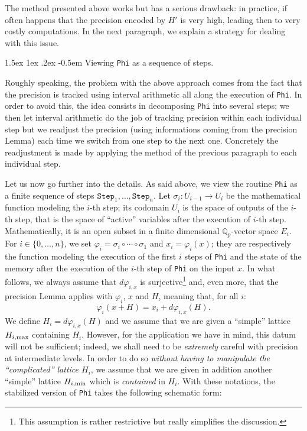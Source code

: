 \documentclass[11pt]{article}
\makeatletter
\numberwithin{equation}{section}
\numberwithin{figure}{section}
\renewcommand\subparagraph{\@startsection{subparagraph}{5}{\z@}%
                                       {1.5ex \@plus1ex \@minus .2ex}%
                                       {-0.5em}%
                                      {\normalfont\normalsize\it}}
\theoremstyle{definition}
\newcommand{\Q}{\mathbb Q}
\newcommand{\Qp}{\Q_p}
\renewcommand{\min}{\text{\rm min}}
\renewcommand{\max}{\text{\rm max}}
\makeatother
\begin{document}
\noindent
The method presented above works but has a serious drawback: in 
practice, if often happens that the precision encoded by $H'$ 
is very high, leading then to very costly computations. In the next 
paragraph, we explain a strategy for dealing with this issue.

\subparagraph{Viewing \textrm{\tt Phi} as a sequence of steps.}

Roughly speaking, the problem with the above approach comes from the 
fact that the precision is tracked using interval arithmetic all along 
the execution of \texttt{Phi}. In order to avoid this, the idea consists 
in decomposing \texttt{Phi} into several steps; we then let interval 
arithmetic do the job of tracking precision within each individual step 
but we readjust the precision (using informations coming from the 
precision Lemma) each time we switch from one step to the next one. 
Concretely the readjustment is made by applying the method of the
previous paragraph to each individual step.

Let us now go further into the details. As said above, we view the routine 
\texttt{Phi} as a finite sequence of steps $\texttt{Step}_1, \ldots, 
\texttt{Step}_n$. Let $\sigma_i : U_{i-1} \to U_i$ be the mathematical 
function modeling the $i$-th step; its codomain $U_i$ is the space of 
outputs of the $i$-th step, that is the space of ``active'' variables 
after the execution of $i$-th step. Mathematically, it is an open 
subset in a finite dimensional $\Qp$-vector space $E_i$. For $i \in \{0, 
\ldots, n\}$, we set $\varphi_i = \sigma_i \circ \cdots \circ \sigma_1$ 
and $x_i = \varphi_i(x)$; they are respectively the function modeling 
the execution of the first $i$ steps of \texttt{Phi} and the state of 
the memory after the execution of the $i$-th step of \texttt{Phi} on the 
input $x$.
In what follows, we always assume that $d\varphi_{i,x}$ is 
surjective\footnote{This assumption is rather restrictive but really 
simplifies the discussion.} and, even more, that the precision Lemma 
applies with $\varphi_i$, $x$ and $H$, meaning that, for all $i$:
\begin{equation}
\label{eq:adapt2}
\varphi_i(x+H) = x_i + d \varphi_{i,x}(H).
\end{equation}
We define $H_i = d \varphi_{i,x}(H)$ and we assume that we
are given a ``simple'' lattice $H_{i,\max}$ containing $H_i$.
However, for the application we have in mind, this datum will not be 
sufficient; indeed, we shall need to be \emph{extremely} careful with
precision at intermediate levels. In order to do so \emph{without having 
to manipulate the ``complicated'' lattice $H_i$}, we assume that we are 
given in addition another ``simple'' lattice $H_{i,\min}$ which is 
\emph{contained} in $H_i$. With these notations, the stabilized version
of \texttt{Phi} takes the following schematic form:
\end{document}
